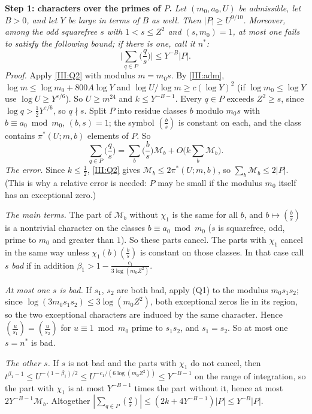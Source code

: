 \documentclass[11pt,letterpaper]{article}
\begin{document}
\textbf{Step 1: characters over the primes of $P$.} \emph{Let $(m_0,a_0,U)$ be admissible, let $B>0$, and let $Y$ be large in terms of $B$ as well. Then
$|P|\ge U^{9/10}$. Moreover, among the odd squarefree $s$ with $1<s\le Z^2$ and $(s,m_0)=1$, at most one fails to satisfy the
following bound; if there is one, call it $n^*$:}
\begin{equation}\label{III:twist}
 \Big|\sum_{q\in P}\Big(\frac qs\Big)\Big|\le Y^{-B}|P| .
\end{equation}
\emph{Proof.} Apply \eqref{III:Q2} with modulus $m=m_0s$. By \eqref{III:adm}, $\log m\le\log m_0+800A\log Y$ and
$\log U/\log m\ge c(\log Y)^2$ (if $\log m_0\le\log Y$ use $\log U\ge Y^{\varepsilon/6}$). So $U\ge m^{24}$ and $k\le Y^{-B-1}$. Every $q\in P$ exceeds $Z^2\ge s$, since $\log q>\frac12Y^{\varepsilon/6}$, so $q\nmid s$. Split $P$ into residue classes $b$ modulo $m_0s$ with $b\equiv a_0\bmod m_0$,
$(b,s)=1$; the symbol $(\frac bs)$ is constant on each, and the class contains $\pi^*(U;m,b)$ elements of
$P$. So
\begin{equation}\label{D:120}
 \sum_{q\in P}\Big(\frac qs\Big)=\sum_b\Big(\frac bs\Big)\mathcal M_b+O\Big(k\sum_b\mathcal M_b\Big).
\end{equation}
\emph{The error.} Since $k\le\frac12$, \eqref{III:Q2} gives $\mathcal M_b\le2\pi^*(U;m,b)$, so
$\sum_b\mathcal M_b\le2|P|$. (This is why a relative error is needed: $P$ may be small if the modulus $m_0$
itself has an exceptional zero.)

\emph{The main terms.} The part of $\mathcal M_b$ without $\chi_1$ is the same for all $b$, and
$b\mapsto(\frac bs)$ is a nontrivial character on the classes $b\equiv a_0\bmod m_0$ ($s$ is squarefree, odd,
prime to $m_0$ and greater than $1$). So these parts cancel. The parts with $\chi_1$ cancel in the same way
unless $\chi_1(b)(\frac bs)$ is constant on those classes. In that case call $s$ \emph{bad} if in addition
$\beta_1>1-\frac{c_1}{3\log(m_0Z^2)}$.

\emph{At most one $s$ is bad.} If $s_1$, $s_2$ are both bad, apply (Q1) to the modulus $m_0s_1s_2$; since
$\log(3m_0s_1s_2)\le3\log(m_0Z^2)$, both exceptional zeros lie in its region, so the two exceptional
characters are induced by the same character. Hence $(\frac u{s_1})=(\frac u{s_2})$ for $u\equiv1\bmod m_0$
prime to $s_1s_2$, and $s_1=s_2$. So at most one $s=n^*$ is bad.

\emph{The other $s$.} If $s$ is not bad and the parts with $\chi_1$ do not cancel, then
$t^{\beta_1-1}\le U^{-(1-\beta_1)/2}\le U^{-c_1/(6\log(m_0Z^2))}\le Y^{-B-1}$ on the range of integration, so the
part with $\chi_1$ is at most $Y^{-B-1}$ times the part without it, hence at most $2Y^{-B-1}\mathcal M_b$.
Altogether $|\sum_{q\in P}(\frac qs)|\le(2k+4Y^{-B-1})|P|\le Y^{-B}|P|$.
\end{document}
